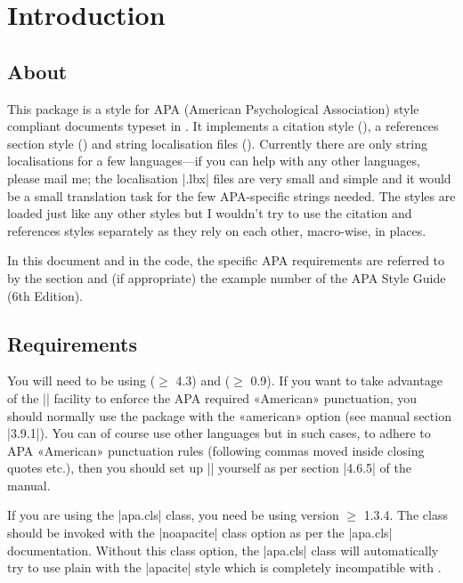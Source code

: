 \documentclass{ltxdockit}
\begin{document}
\printtitlepage
\tableofcontents

\section{Introduction}
\label{int}

\subsection{About}

This package is a  style for APA (American Psychological
Association) style compliant documents typeset in \latex. It implements a
citation style (), a references section style
() and string localisation files ().
Currently there are only string localisations for a few languages---if you can help with any other languages, please mail me; the
localisation |.lbx| files are very small and simple and it would be a small
translation task for the few APA-specific strings needed.
The styles are loaded just like any other  styles but I
wouldn't try to use the citation and references styles separately as they
rely on each other, macro-wise, in places.

In this document and in the code, the specific APA requirements are
referred to by the section and (if appropriate) the example number of the
APA Style Guide (6th Edition).

\subsection{Requirements}\label{ref:req}

You will need to be using  ($\geq$ 4.3) and 
($\geq$ 0.9). If you want to take advantage of the 
|\DeclareQuotePunctuation| facility to enforce the APA required «American»
punctuation, you should normally use the  package with the «american»
option (see  manual section |3.9.1|). You can of course use
other languages but in such cases, to adhere to APA «American» punctuation
rules (following commas moved inside closing quotes etc.), then you should
set up |\DeclareQuotePunctuation| yourself as per section |4.6.5| of the
 manual.

If you are using the |apa.cls| \latex class, you need be using version
$\geq$ 1.3.4. The class should be invoked with the |noapacite| class option
as per the |apa.cls| documentation. Without this class option, the
|apa.cls| class will automatically try to use plain \bibtex with the
|apacite| style which is completely incompatible with .
\end{document}
